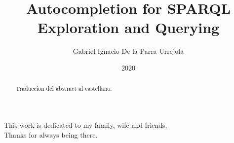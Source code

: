 \documentclass[upright, contnum]{umemoria}
\author{Gabriel Ignacio De la Parra Urrejola}
\title{Autocompletion for SPARQL Exploration and Querying}
\date{2020}
\begin{document}
\frontmatter
\maketitle

\begin{abstract}
Traduccion del abstract al castellano.
\end{abstract}

\begin{dedicatoria} %
This work is dedicated to my family, wife and friends.\\
Thanks for always being there.
\end{dedicatoria}


\cleardoublepage

\tableofcontents
\listoftables %
\listoffigures %

\mainmatter














\end{document}
